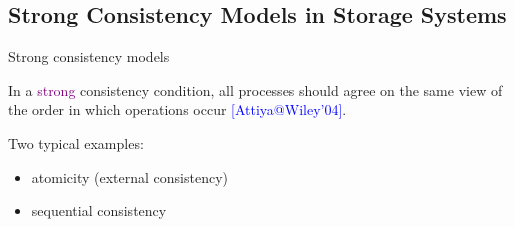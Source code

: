 \documentclass{beamer}
\makeatletter
\newcommand{\citeinbeamer}[3]{{\scriptsize{\textcolor{blue}{[#1@#2'#3]}}}}
\newcommand{\largepurple}[1]{\textcolor{purple}{\large #1}}
\makeatother
\begin{document}
\subsection{Strong Consistency Models in Storage Systems}

\begin{frame}{Strong consistency models}
  \begin{definition}
    In a \largepurple{strong} consistency condition, all processes should agree
    on the same view of the order in which operations occur
    \citeinbeamer{Attiya}{Wiley}{04}.
  \end{definition}

  \begin{exampleblock}{Two typical examples:}
    \begin{itemize}
      \item atomicity (external consistency)
      \item sequential consistency
    \end{itemize}
  \end{exampleblock}
\end{frame}
\end{document}
